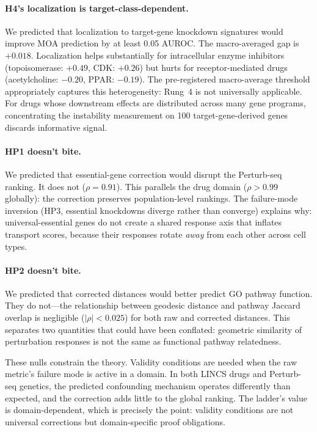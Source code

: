 \documentclass{article}
\begin{document}
\paragraph{H4's localization is target-class-dependent.}
We predicted that localization to target-gene knockdown signatures would
improve MOA prediction by at least 0.05 AUROC. The macro-averaged gap is
$+0.018$. Localization helps substantially for intracellular enzyme
inhibitors (topoisomerase: $+0.49$, CDK: $+0.26$) but hurts for
receptor-mediated drugs (acetylcholine: $-0.20$, PPAR: $-0.19$). The
pre-registered macro-average threshold appropriately captures this
heterogeneity: Rung~4 is not universally applicable. For drugs whose
downstream effects are distributed across many gene programs, concentrating
the instability measurement on 100 target-gene-derived genes discards
informative signal.

\paragraph{HP1 doesn't bite.}
We predicted that essential-gene correction would disrupt the Perturb-seq
ranking. It does not ($\rho = 0.91$). This parallels the drug domain ($\rho
> 0.99$ globally): the correction preserves population-level rankings. The
failure-mode inversion
(HP3, essential knockdowns diverge rather than converge) explains why:
universal-essential genes do not create a shared response axis that inflates
transport scores, because their responses rotate \emph{away} from each other
across cell types.

\paragraph{HP2 doesn't bite.}
We predicted that corrected distances would better predict GO pathway
function. They do not---the relationship between geodesic distance and
pathway Jaccard overlap is negligible ($|\rho| < 0.025$) for both raw and
corrected distances. This separates two quantities that could have been
conflated: geometric similarity of perturbation responses is not the same as
functional pathway relatedness.

These nulls constrain the theory. Validity conditions are needed when the raw
metric's failure mode is active in a domain. In both LINCS drugs and
Perturb-seq genetics, the predicted confounding mechanism operates differently
than expected, and the correction adds little to the global ranking. The
ladder's value is domain-dependent, which is precisely the point: validity
conditions are not universal corrections but domain-specific proof obligations.
\end{document}
